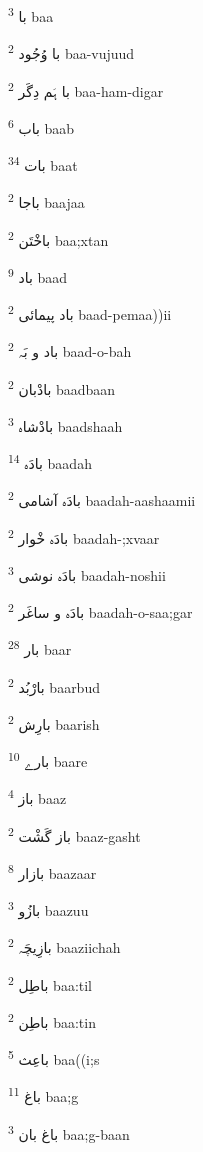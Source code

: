 \documentclass[12pt]{article}
\begin{document}
\begin{RTL}
\begin{multicols}{5}
{\ur با}   \textsuperscript{3} baa

{\ur با وُجُود}   \textsuperscript{2} baa-vujuud

{\ur با ہَم دِگَر}   \textsuperscript{2} baa-ham-digar

{\ur باب}   \textsuperscript{6} baab

{\ur بات}   \textsuperscript{34} baat

{\ur باجا}   \textsuperscript{2} baajaa

{\ur باخْتَن}   \textsuperscript{2} baa;xtan

{\ur باد}   \textsuperscript{9} baad

{\ur باد پیمائی}   \textsuperscript{2} baad-pemaa))ii

{\ur باد و بَہ}   \textsuperscript{2} baad-o-bah

{\ur بادْبان}   \textsuperscript{2} baadbaan

{\ur بادْشاہ}   \textsuperscript{3} baadshaah

{\ur بادَہ}   \textsuperscript{14} baadah

{\ur بادَہ آشامی}   \textsuperscript{2} baadah-aashaamii

{\ur بادَہ خْوار}   \textsuperscript{2} baadah-;xvaar

{\ur بادَہ نوشی}   \textsuperscript{3} baadah-noshii

{\ur بادَہ و ساغَر}   \textsuperscript{2} baadah-o-saa;gar

{\ur بار}   \textsuperscript{28} baar

{\ur بارْبُد}   \textsuperscript{2} baarbud

{\ur بارِش}   \textsuperscript{2} baarish

{\ur بارے}   \textsuperscript{10} baare

{\ur باز}   \textsuperscript{4} baaz

{\ur باز گَشْت}   \textsuperscript{2} baaz-gasht

{\ur بازار}   \textsuperscript{8} baazaar

{\ur بازُو}   \textsuperscript{3} baazuu

{\ur بازِیچَہ}   \textsuperscript{2} baaziichah

{\ur باطِل}   \textsuperscript{2} baa:til

{\ur باطِن}   \textsuperscript{2} baa:tin

{\ur باعِث}   \textsuperscript{5} baa((i;s

{\ur باغ}   \textsuperscript{11} baa;g

{\ur باغ بان}   \textsuperscript{3} baa;g-baan


\end{multicols}
\end{RTL}
\end{document}
